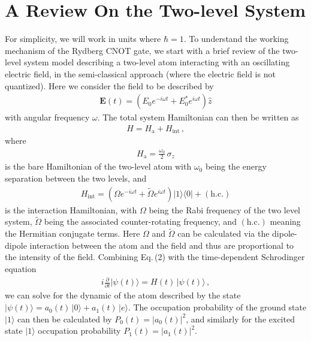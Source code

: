 \documentclass[reprint, amsmath, amssymb, aps]{revtex4-2}
\newcommand{\that}[1]{\widetilde{#1}}
\begin{document}
\section{\label{sec:level1}A Review On the Two-level System}
For simplicity, we will work in units where $\hbar = 1$. To understand the working mechanism of the Rydberg CNOT gate, we start with a brief review of the two-level system model describing a two-level atom interacting with an oscillating electric field, in the semi-classical approach (where the electric field is not quantized). Here we consider the field to be described by 
\begin{align}
\mathbf{E}(t) = (E_0 e^{-i\omega t} + E_0^*e^{i\omega t})\hat{z}
\end{align}
with angular frequency $\omega$. The total system Hamiltonian can then be written as
\begin{align}
H = H_{\text{a}} + H_{\text{int}}\,,
\end{align}
where
\begin{align}
H_{\text{a}} = \frac{\omega_0}{2}\, \sigma_z 
\end{align}
is the bare Hamiltonian of the two-level atom with $\omega_0$ being the energy separation between the two levels, and 
\begin{align}
H_{\text{int}}  =  (\Omega e^{-i\omega t}+ \that{\Omega} e^{i\omega t} )|1\rangle \langle 0| + (\text{h.c.})
\end{align}
is the interaction Hamiltonian, with $\Omega$ being the Rabi frequency of the two level system, $\that{\Omega}$ being the associated counter-rotating frequency, and $(\text{h.c.})$ meaning the Hermitian conjugate terms. Here $\Omega$ and $\that{\Omega}$ can be calculated via the dipole-dipole interaction between the atom and the field and thus are proportional to the intensity of the field. Combining Eq.\,(2) with the time-dependent Schrodinger equation
\begin{align}
i \frac{\partial}{\partial t}|\psi(t)\rangle = H(t)\, |\psi(t)\rangle\,,
\end{align}
we can solve for the dynamic of the atom described by the state $|\psi(t)\rangle = a_0(t)\,|0\rangle + a_1(t)\, |e\rangle $. The occupation probability of the ground state $|1\rangle$ can then be calculated by $P_0(t) = |a_0(t)|^2$, and similarly for the excited state $|1\rangle$ occupation probability $P_1(t) = |a_1(t)|^2$. \\
\end{document}
